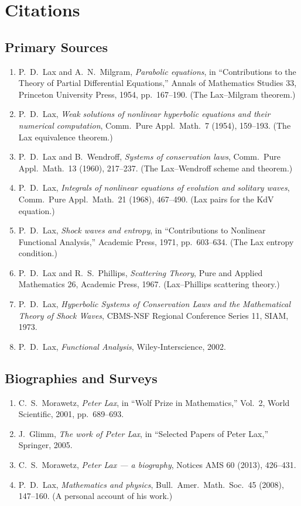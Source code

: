 \section{Citations}\subsection*{Primary Sources}
\begin{enumerate}
    \item P.\ D.\ Lax and A.\ N.\ Milgram, \textit{Parabolic equations}, in ``Contributions to the Theory of Partial Differential Equations,'' Annals of Mathematics Studies 33, Princeton University Press, 1954, pp.\ 167--190. (The Lax--Milgram theorem.)
    \item P.\ D.\ Lax, \textit{Weak solutions of nonlinear hyperbolic equations and their numerical computation}, Comm.\ Pure Appl.\ Math.\ 7 (1954), 159--193. (The Lax equivalence theorem.)
    \item P.\ D.\ Lax and B.\ Wendroff, \textit{Systems of conservation laws}, Comm.\ Pure Appl.\ Math.\ 13 (1960), 217--237. (The Lax--Wendroff scheme and theorem.)
    \item P.\ D.\ Lax, \textit{Integrals of nonlinear equations of evolution and solitary waves}, Comm.\ Pure Appl.\ Math.\ 21 (1968), 467--490. (Lax pairs for the KdV equation.)
    \item P.\ D.\ Lax, \textit{Shock waves and entropy}, in ``Contributions to Nonlinear Functional Analysis,'' Academic Press, 1971, pp.\ 603--634. (The Lax entropy condition.)
    \item P.\ D.\ Lax and R.\ S.\ Phillips, \textit{Scattering Theory}, Pure and Applied Mathematics 26, Academic Press, 1967. (Lax--Phillips scattering theory.)
    \item P.\ D.\ Lax, \textit{Hyperbolic Systems of Conservation Laws and the Mathematical Theory of Shock Waves}, CBMS-NSF Regional Conference Series 11, SIAM, 1973.
    \item P.\ D.\ Lax, \textit{Functional Analysis}, Wiley-Interscience, 2002.
\end{enumerate}

\subsection*{Biographies and Surveys}
\begin{enumerate}
    \item C.\ S.\ Morawetz, \textit{Peter Lax}, in ``Wolf Prize in Mathematics,'' Vol.\ 2, World Scientific, 2001, pp.\ 689--693.
    \item J.\ Glimm, \textit{The work of Peter Lax}, in ``Selected Papers of Peter Lax,'' Springer, 2005.
    \item C.\ S.\ Morawetz, \textit{Peter Lax --- a biography}, Notices AMS 60 (2013), 426--431.
    \item P.\ D.\ Lax, \textit{Mathematics and physics}, Bull.\ Amer.\ Math.\ Soc.\ 45 (2008), 147--160. (A personal account of his work.)
\end{enumerate}

